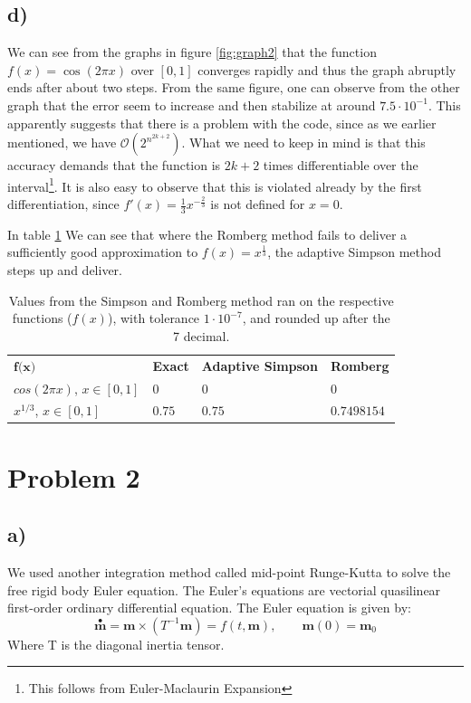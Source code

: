 \documentclass[12pt, a4paper,usenames,dvipsnames]{article}
\renewcommand\vec{\mathbf}
\begin{document}
\subsection*{d)}
We can see from the graphs in figure \ref{fig:graph2} that the function \(f(x)=\cos(2\pi x)\) over \([0,1]\) converges rapidly and thus the graph abruptly ends after about two steps. From the same figure, one can observe from the other graph that the error seem to increase and then stabilize at around \(7.5\cdot 10^{-1}\). This apparently suggests that there is a problem with the code, since as we earlier mentioned, we have \(\mathcal{O}(2^{n^{2k+2}})\). What we need to keep in mind is that this accuracy demands that the function is \(2k+2\) times differentiable over the interval\footnote{This follows from Euler-Maclaurin Expansion}. It is also easy to observe that this is violated already by the first differentiation, since \(f'(x)=\frac{1}{3}x^{-\frac{2}{3}}\) is not defined for \(x=0\).

In table \ref{tab:simpsRomb} We can see that where the Romberg method fails to deliver a sufficiently good approximation to \(f(x)=x^{\frac{1}{3}}\), the adaptive Simpson method steps up and deliver.
\restoregeometry
\begin{table}[h]
\centering
\begin{tabular}{p{2cm}p{2.5cm}ll}

\rowcolor{XKCDpale}$\textbf{f(x)}$                     & \textbf{Exact}               & \textbf{Adaptive Simpson} & \textbf{Romberg} \\ \rowcolor{tableBack}
$cos(2 \pi x)$, \newline$x \in [0, 1]$      & 0                            & 0          & 0       \\ \rowcolor{tableBack}
$x^{1/3}$, \newline$x \in [0, 1]$ & $0.75$& $0.75$          & $0.7498154$       \\ 
\end{tabular}
\caption{Values from the Simpson and Romberg method ran on the respective functions ($f(x)$), with tolerance $1\cdot10^{-7}$, and rounded up after the 7 decimal.}
\label{tab:simpsRomb}
\end{table}
\section*{Problem 2}
\subsection*{a)}
We used another integration method called mid-point Runge-Kutta to solve the free rigid body Euler equation. The Euler's equations are vectorial quasilinear first-order ordinary differential equation. The Euler equation is given by: 
\[\stackrel{\bullet}{\vec{m}} =\vec{m}\times({T^{-1}}\vec{m})=f(t,\vec{m}),\qquad \vec{m}(0)=\vec{m}_0\]
Where T is the diagonal inertia tensor. 
\end{document}
